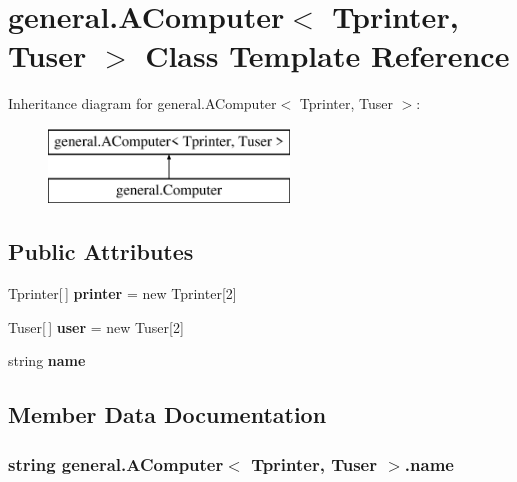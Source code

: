 \section{general.\-A\-Computer$<$ Tprinter, Tuser $>$ Class Template Reference}
\label{classgeneral_1_1_a_computer_3_01_tprinter_00_01_tuser_01_4}
Inheritance diagram for general.\-A\-Computer$<$ Tprinter, Tuser $>$\-:\begin{figure}[H]
\begin{center}
\leavevmode
\includegraphics[height=2.000000cm]{classgeneral_1_1_a_computer_3_01_tprinter_00_01_tuser_01_4}
\end{center}
\end{figure}
\subsection*{Public Attributes}
\begin{DoxyCompactItemize}
\item 
Tprinter[$\,$] {\bf printer} = new Tprinter[2]
\item 
Tuser[$\,$] {\bf user} = new Tuser[2]
\item 
string {\bf name}
\end{DoxyCompactItemize}


\subsection{Member Data Documentation}
\subsubsection[{name}]{\setlength{\rightskip}{0pt plus 5cm}string general.\-A\-Computer$<$ Tprinter, Tuser $>$.name}\label{classgeneral_1_1_a_computer_3_01_tprinter_00_01_tuser_01_4_a2757225751249691a992ac3131490c77}
